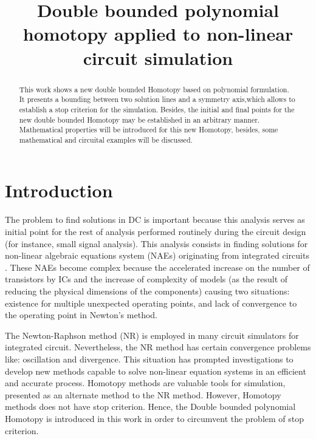 \documentclass[conference,letterpaper,twocolumn]{IEEEtran}
\begin{document}
\title{Double bounded polynomial homotopy applied to non-linear circuit simulation}



\maketitle

\begin{abstract}

This work shows a new double bounded Homotopy based on polynomial formulation. It presents a bounding between two solution lines and a symmetry axis,which allows to establish a stop criterion for the simulation. Besides, the initial and final points for the new double bounded Homotopy may be established in an arbitrary manner. Mathematical properties will be introduced for this new Homotopy, besides, some mathematical and circuital examples will be discussed.

\end{abstract}
 

\section{Introduction}

The problem to find solutions in DC is important because this analysis serves as initial point for the rest of analysis performed routinely during the circuit design (for instance, small signal analysis)\cite{homo_ogrodzki}. This analysis consists in finding solutions for non-linear algebraic equations system (NAEs) originating from integrated circuits \cite{Schwa_book}. These NAEs become complex because the accelerated increase on the number of transistors by ICs and the increase of complexity of models (as the result of reducing the physical dimensions of the components) causing two situations: existence for multiple unexpected operating points, and lack of convergence to the operating point in Newton's method.

The Newton-Raphson method (NR) is employed in many circuit simulators for integrated circuit. Nevertheless, the NR method has certain convergence problems \cite{Schwa_book} like: oscillation and divergence. This situation has prompted investigations to develop new methods capable to solve non-linear equation systems in an efficient and accurate process.
Homotopy methods \cite{BHLHOM,homo_ArtificialP} are valuable tools for simulation, presented as an alternate method to the NR method. However, Homotopy methods does not have stop criterion. Hence, the Double bounded polynomial Homotopy is introduced in this work in order to circumvent the problem of stop criterion.
\end{document}
